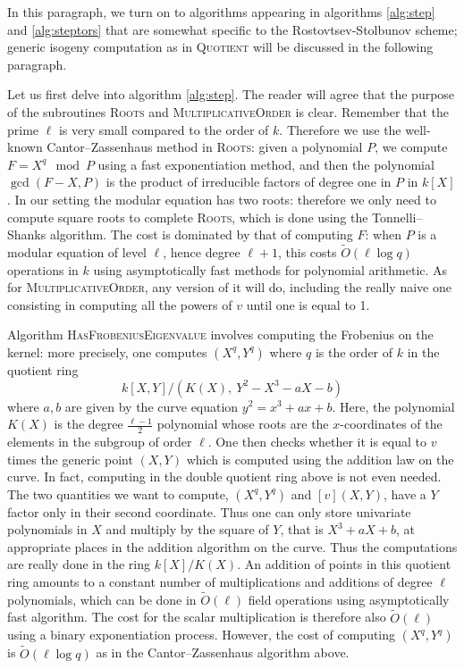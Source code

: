 \documentclass{article}
\newcommand{\softO}{\tilde{O}}
\newcommand{\algstyle}[1]{\textsc{#1}}
\renewcommand{\v}{\vspace{5mm}}
\theoremstyle{definition}
\begin{document}
In this paragraph, we turn on to algorithms appearing in algorithms \ref{alg:step}
and \ref{alg:steptors} that are somewhat specific to the Rostovtsev-Stolbunov
scheme; generic isogeny computation as in \algstyle{Quotient} will be discussed
in the following paragraph.
\v

Let us first delve into algorithm \ref{alg:step}.
The reader will agree that the purpose of the subroutines \algstyle{Roots}
and \algstyle{MultiplicativeOrder} is clear. Remember that the
prime $\ell$ is very small compared to the order of $k$. Therefore we use the
well-known Cantor--Zassenhaus method in \algstyle{Roots}:
given a polynomial $P$,
we compute $F = X^q \mod P$ using a fast exponentiation method, and then the polynomial
$\gcd(F - X, P)$ is the product of irreducible factors of degree one in $P$
in $k[X]$. In our setting the modular equation has two roots: therefore we only need
to compute square roots to complete \algstyle{Roots}, which is
done using the Tonnelli--Shanks algorithm. The cost is dominated
by that of computing $F$: when $P$ is a modular equation
of level $\ell$, hence degree $\ell + 1$, this costs $\softO(\ell\log q)$ operations in $k$
using asymptotically fast methods for polynomial arithmetic. As for \algstyle{MultiplicativeOrder},
any version of it will do, including the really naive one consisting in computing
all the powers of $v$ until one is equal to 1.

Algorithm \algstyle{HasFrobeniusEigenvalue}
involves computing the Frobenius on the kernel: more precisely, one computes $(X^q, Y^q)$
where $q$ is the order of $k$ in the quotient ring
\[
k[X, Y]/(K(X),\ Y^2 - X^3 - aX - b)
\]
where $a, b$ are given by the curve equation $y^2 = x^3 + ax + b$. Here, the polynomial
$K(X)$ is the degree $\frac{\ell-1}{2}$ polynomial whose roots are the $x$-coordinates of the elements
in the subgroup of order $\ell$. One then checks whether it is equal to $v$ times the generic
point $(X, Y)$ which is computed using the addition law on the curve. In fact, computing
in the double quotient ring above is not even needed. The two quantities we want to compute,
$(X^q, Y^q)$ and $[v](X, Y)$, have a $Y$ factor only in their second coordinate. Thus one
can only store univariate polynomials in $X$ and multiply by the square of $Y$, that is
$X^3 + aX + b$, at appropriate places in the addition algorithm on the curve. Thus the
computations are really done in the ring $k[X]/K(X)$. An addition of points in this
quotient ring amounts to a constant number of multiplications and additions of degree $\ell$
polynomials, which can be done in $\softO(\ell)$ field operations using
asymptotically fast algorithm. The cost for the scalar multiplication is therefore also
$\softO(\ell)$ using a binary exponentiation process. However, the cost of computing
$(X^q, Y^q)$ is $\softO(\ell\log q)$ as in the Cantor--Zassenhaus algorithm above.
\end{document}
